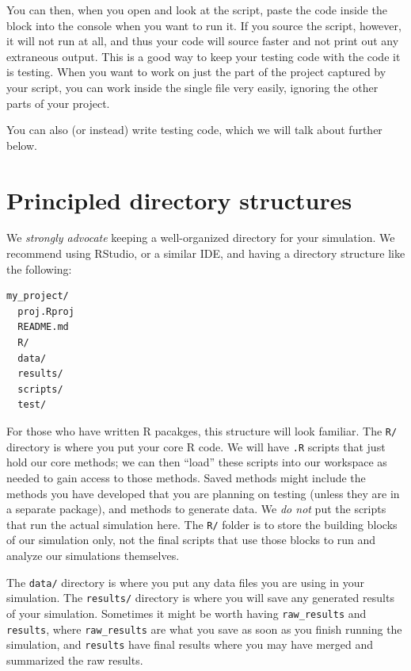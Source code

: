 \documentclass[
]{book}
\begin{document}
You can then, when you open and look at the script, paste the code inside the block into the console when you want to run it.
If you source the script, however, it will not run at all, and thus your code will source faster and not print out any extraneous output.
This is a good way to keep your testing code with the code it is testing.
When you want to work on just the part of the project captured by your script, you can work inside the single file very easily, ignoring the other parts of your project.

You can also (or instead) write testing code, which we will talk about further below.

\section{Principled directory structures}\label{principled-directory-structures}

We \emph{strongly advocate} keeping a well-organized directory for your simulation.
We recommend using RStudio, or a similar IDE, and having a directory structure like the following:

\begin{verbatim}
my_project/
  proj.Rproj
  README.md
  R/
  data/
  results/
  scripts/
  test/
\end{verbatim}

For those who have written R pacakges, this structure will look familiar.
The \texttt{R/} directory is where you put your core R code.
We will have \texttt{.R} scripts that just hold our core methods; we can then ``load'' these scripts into our workspace as needed to gain access to those methods.
Saved methods might include the methods you have developed that you are planning on testing (unless they are in a separate package), and methods to generate data.
We \emph{do not} put the scripts that run the actual simulation here. The \texttt{R/} folder is to store the building blocks of our simulation only, not the final scripts that use those blocks to run and analyze our simulations themselves.

The \texttt{data/} directory is where you put any data files you are using in your simulation.
The \texttt{results/} directory is where you will save any generated results of your simulation.
Sometimes it might be worth having \texttt{raw\_results} and \texttt{results}, where \texttt{raw\_results} are what you save as soon as you finish running the simulation, and \texttt{results} have final results where you may have merged and summarized the raw results.
\end{document}
